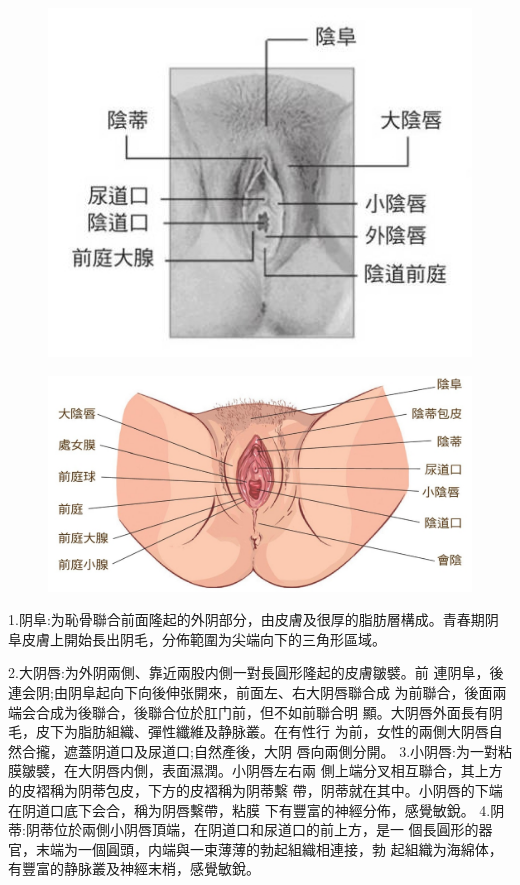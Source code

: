 \documentclass[12pt,UTF8]{ctexbook}
\begin{document}
\begin{figure}[htbp]
	\centering
	\includegraphics[width=0.7\linewidth]{2}
	\caption{}
	\label{fig:1}
\end{figure}

\begin{figure}[htbp]
	\centering
	\includegraphics[width=0.7\linewidth]{7}
	\caption{}
	\label{fig:1}
\end{figure}

1.阴阜:为恥骨聯合前面隆起的外阴部分，由皮膚及很厚的脂肪層構成。青春期阴阜皮膚上開始長出阴毛，分佈範圍为尖端向下的三角形區域。

2.大阴唇:为外阴兩側、靠近兩股内側一對長圓形隆起的皮膚皺襞。前
連阴阜，後連会阴;由阴阜起向下向後伸张開來，前面左、右大阴唇聯合成
为前聯合，後面兩端会合成为後聯合，後聯合位於肛门前，但不如前聯合明
顯。大阴唇外面長有阴毛，皮下为脂肪組織、彈性纖維及静脉叢。在有性行
为前，女性的兩側大阴唇自然合攏，遮蓋阴道口及尿道口;自然產後，大阴
唇向兩側分開。
3.小阴唇:为一對粘膜皺襞，在大阴唇内側，表面濕潤。小阴唇左右兩
側上端分叉相互聯合，其上方的皮褶稱为阴蒂包皮，下方的皮褶稱为阴蒂繫
帶，阴蒂就在其中。小阴唇的下端在阴道口底下会合，稱为阴唇繫帶，粘膜
下有豐富的神經分佈，感覺敏銳。
4.阴蒂:阴蒂位於兩側小阴唇頂端，在阴道口和尿道口的前上方，是一
個長圓形的器官，末端为一個圓頭，内端與一束薄薄的勃起組織相連接，勃
起組織为海綿体，有豐富的静脉叢及神經末梢，感覺敏銳。
\end{document}
